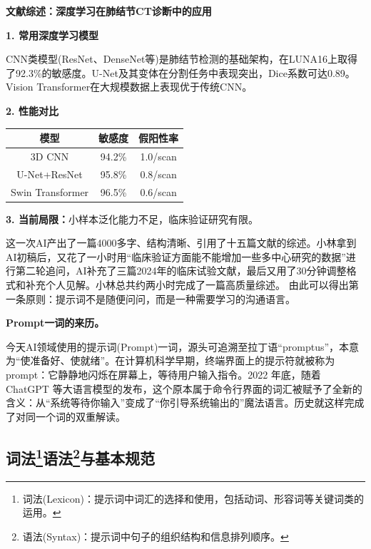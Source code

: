 \begin{aibox}
\textbf{文献综述：深度学习在肺结节CT诊断中的应用}

\textbf{1. 常用深度学习模型}

CNN类模型(ResNet、DenseNet等)是肺结节检测的基础架构，在LUNA16上取得了92.3\%的敏感度。U-Net及其变体在分割任务中表现突出，Dice系数可达0.89。Vision Transformer在大规模数据上表现优于传统CNN。

\textbf{2. 性能对比}

\begin{formalTable}[H]
\caption{不同模型在LUNA16数据集上的性能对比}
\label{tab:ch3_01_model_performance}
\begin{tabular}{c c c}
\toprule
模型 & 敏感度 & 假阳性率 \\ \midrule
3D CNN & 94.2\% & 1.0/scan \\
U-Net+ResNet & 95.8\% & 0.8/scan \\
Swin Transformer & 96.5\% & 0.6/scan \\ \bottomrule
\end{tabular}
\end{formalTable}

\textbf{3. 当前局限：}小样本泛化能力不足，临床验证研究有限。
\end{aibox}

这一次AI产出了一篇4000多字、结构清晰、引用了十五篇文献的综述。小林拿到AI初稿后，又花了一小时用“临床验证方面能不能增加一些多中心研究的数据”进行第二轮追问，AI补充了三篇2024年的临床试验文献，最后又用了30分钟调整格式和补充个人见解。小林总共约两小时完成了一篇高质量综述。
由此可以得出第一条原则：提示词不是随便问问，而是一种需要学习的沟通语言。

\begin{funbox}
\textbf{Prompt一词的来历。} 

今天AI领域使用的提示词(Prompt)一词，源头可追溯至拉丁语“promptus”，本意为“使准备好、使就绪”。在计算机科学早期，终端界面上的提示符就被称为prompt：它静静地闪烁在屏幕上，等待用户输入指令。2022 年底，随着 ChatGPT 等大语言模型的发布，这个原本属于命令行界面的词汇被赋予了全新的含义：从“系统等待你输入”变成了“你引导系统输出的”魔法语言。历史就这样完成了对同一个词的双重解读。
\end{funbox}

\subsection[词法语法与基本规范]{\textbf{词法}\footnote{词法(Lexicon)：提示词中词汇的选择和使用，包括动词、形容词等关键词类的运用。}\textbf{语法}\footnote{语法(Syntax)：提示词中句子的组织结构和信息排列顺序。}与基本规范}

